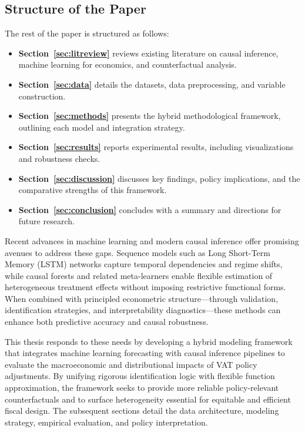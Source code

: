 \subsection{Structure of the Paper}\label{subsec:structure}

The rest of the paper is structured as follows:

\begin{itemize}
    \item \textbf{Section~\ref{sec:litreview}} reviews existing literature on causal inference, machine learning for economics, and counterfactual analysis.
    
    \item \textbf{Section~\ref{sec:data}} details the datasets, data preprocessing, and variable construction.
    
    \item \textbf{Section~\ref{sec:methods}} presents the hybrid methodological framework, outlining each model and integration strategy.
    
    \item \textbf{Section~\ref{sec:results}} reports experimental results, including visualizations and robustness checks.
    
    \item \textbf{Section~\ref{sec:discussion}} discusses key findings, policy implications, and the comparative strengths of this framework.
    
    \item \textbf{Section~\ref{sec:conclusion}} concludes with a summary and directions for future research.
\end{itemize}

Recent advances in machine learning and modern causal inference offer promising avenues to address these gaps. Sequence models such as Long Short-Term Memory (LSTM) networks capture temporal dependencies and regime shifts, while causal forests and related meta-learners enable flexible estimation of heterogeneous treatment effects without imposing restrictive functional forms. When combined with principled econometric structure—through validation, identification strategies, and interpretability diagnostics—these methods can enhance both predictive accuracy and causal robustness.

This thesis responds to these needs by developing a hybrid modeling framework that integrates machine learning forecasting with causal inference pipelines to evaluate the macroeconomic and distributional impacts of VAT policy adjustments. By unifying rigorous identification logic with flexible function approximation, the framework seeks to provide more reliable policy-relevant counterfactuals and to surface heterogeneity essential for equitable and efficient fiscal design. The subsequent sections detail the data architecture, modeling strategy, empirical evaluation, and policy interpretation.


